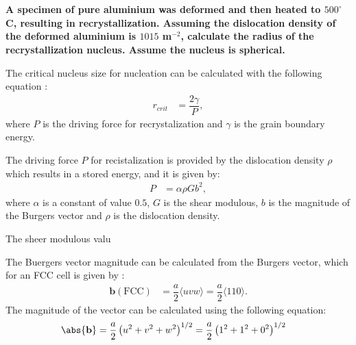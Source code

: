 \newpage
\section{}

\textbf{A specimen of pure aluminium was deformed and then heated to $500^{\circ}$C, resulting in recrystallization. Assuming the dislocation density of the deformed aluminium is $1015$ m$^{-2}$, calculate the radius of the recrystallization nucleus. Assume the nucleus is spherical.}

The critical nucleus size for nucleation can be calculated with the following equation \citet{rollett2017recrystallization}:
\begin{align}
    \label{eq:r_recrystallization}
    r_{crit}&=\dfrac{2\gamma}{P},
\end{align}
where $P$ is the driving force for recrystalization and $\gamma$ is the grain boundary energy.

The driving force $P$ for recistalization is provided by the dislocation density $\rho$ which results in a stored energy, and it is given by:
\begin{align}
    \label{eq:drivin_force}
    P&=\alpha \rho Gb^2,
\end{align}
where $\alpha$ is a constant of value $0.5$, $G$ is the shear modulous, $b$ is the magnitude of the Burgers vector and $\rho$ is the dislocation density.

The sheer modulous valu

The Buergers vector magnitude can be calculated from the Burgers vector, which for an FCC cell is given by \citet{callister2010materials}:
\begin{align}
    \label{eq:fcc_vector}
    \mathbf{b}(\text{FCC})&=\dfrac{a}{2}\langle uvw\rangle=\dfrac{a}{2}\langle110\rangle.
\end{align}
The magnitude of the vector can be calculated using the following equation:
\begin{align}
    \label{eq:vector_magnitude}
    \abs{\mathbf{b}}&=\dfrac{a}{2}\left(u^{2}+v^{2}+w^{2}\right)^{1/2}=\dfrac{a}{2}\left(1^{2}+1^{2}+0^{2}\right)^{1/2}
\end{align}

